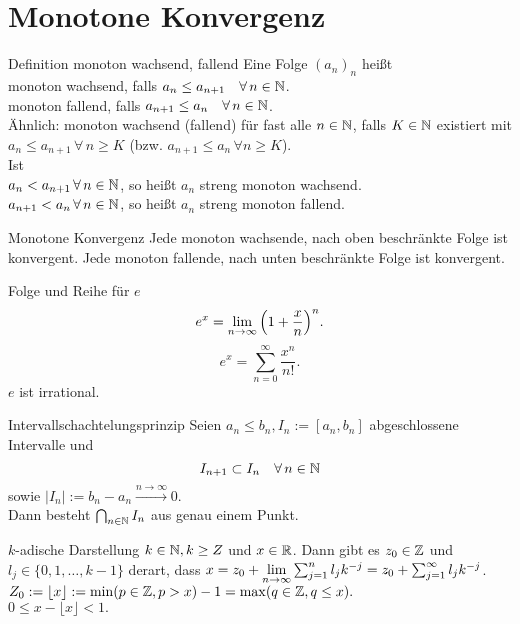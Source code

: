 \documentclass[main.tex]{subfiles}
\begin{document}
\section*{Monotone Konvergenz}
\begin{karte}{Definition monoton wachsend, fallend}
    Eine Folge \({(a_n)}_n\) heißt \\
    monoton wachsend, falls 
    \(a_n\leq a_{n+1} \quad \forall n\in\N \).\\
    monoton fallend, falls \(a_{n+1} \leq 
    a_n \quad \forall n\in\N \).\\
    Ähnlich: monoton wachsend (fallend) 
    für fast alle \(n\in\mathbb{N} \), falls \( K\in\mathbb{N} \) 
    existiert mit \( a_n\leq a_{n+1} \, 
    \forall \, n\geq K \) (bzw. \( a_{n+1}
    \leq a_n \, \forall n\geq K \)).\\
	Ist \\
    \( a_n<a_{n+1} \, \forall n\in\N \), 
    so heißt \(a_n\) streng monoton wachsend.\\
    \( a_{n+1}<a_n \, \forall n\in\N \), 
    so heißt \(a_n\) streng monoton fallend.
\end{karte}
\begin{karte}{Monotone Konvergenz}
    Jede monoton wachsende, nach oben beschränkte 
    Folge ist konvergent. Jede monoton fallende, 
    nach unten beschränkte Folge ist konvergent.
\end{karte}
\begin{karte}{Folge und Reihe für \(e\)}
    \[ e^x = \lim\limits_{n\rightarrow\infty} {\left(1+\frac{x}{n}\right)}^n. \]
    \[ e^x = \sum_{n=0}^\infty \frac{x^n}{n!}. \]
    \( e \) ist irrational.
\end{karte}
\begin{karte}{Intervallschachtelungsprinzip}
    Seien \( a_n\leq b_n, I_n := [a_n,b_n] \) 
    abgeschlossene Intervalle und 
    \[I_{n+1} \subset I_n \quad \forall n\in\N \]
    sowie \( |I_n| := b_n - a_n 
    \overset{n\rightarrow\infty}{\longrightarrow} 0 \).\\
	Dann besteht \(\bigcap_{n\in\mathbb{N}} I_n\) aus genau einem Punkt.\\
\end{karte}
\begin{karte}{\(k\)-adische Darstellung}
    \(k\in\mathbb{N}, k\geq Z\) und \(x\in\mathbb{R} \). 
    Dann gibt es \(z_0\in \mathbb{Z} \) und 
    \(l_j \in \{0,1,\ldots,k-1\} \) derart, 
    dass \(x = z_0 + \lim\limits_{n\rightarrow\infty} \sum_{j=1}^{n} 
    l_j k^{-j} = z_0 + \sum_{j=1}^{\infty} l_j k^{-j} \).\\
    \(Z_0 := \lfloor x \rfloor := \min(p\in\mathbb{Z}, p>x) -1 
    = \max(q\in\mathbb{Z}, q\leq x). \) \\
	\( 0\leq x-\lfloor x\rfloor <1. \) \\
\end{karte}
\end{document}
